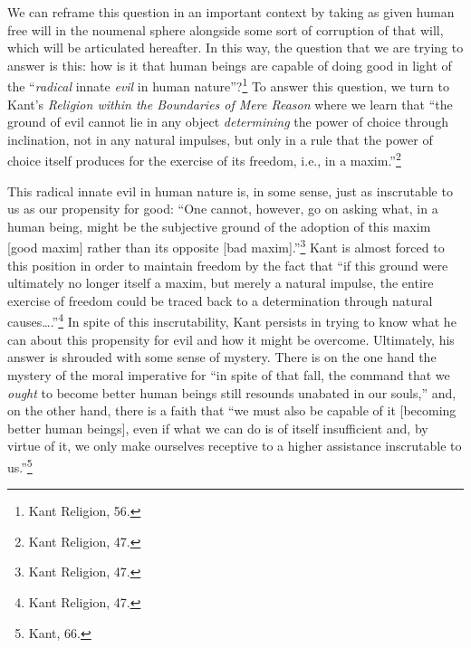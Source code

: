 \documentclass[12pt]{article}
\begin{document}
	We can reframe this question in an important context by taking as given human free will in the noumenal sphere alongside some sort of corruption of that will, which will be articulated hereafter. In this way, the question that we are trying to answer is this: how is it that human beings are capable of doing good in light of the ``\emph{radical} innate \emph{evil} in human nature''?\footnote{Kant Religion, 56.} To answer this question, we turn to Kant's \emph{Religion within the Boundaries of Mere Reason} where we learn that ``the ground of evil cannot lie in any object \emph{determining} the power of choice through inclination, not in any natural impulses, but only in a rule that the power of choice itself produces for the exercise of its freedom, i.e., in a maxim.''\footnote{Kant Religion, 47.}

	This radical innate evil in human nature is, in some sense, just as inscrutable to us as our propensity for good: ``One cannot, however, go on asking what, in a human being, might be the subjective ground of the adoption of this maxim [good maxim] rather than its opposite [bad maxim].''\footnote{Kant Religion, 47.} Kant is almost forced to this position in order to maintain freedom by the fact that ``if this ground were ultimately no longer itself a maxim, but merely a natural impulse, the entire exercise of freedom could be traced back to a determination through natural causes\ldots.''\footnote{Kant Religion, 47.} In spite of this inscrutability, Kant persists in trying to know what he can about this propensity for evil and how it might be overcome. Ultimately, his answer is shrouded with some sense of mystery. There is on the one hand the mystery of the moral imperative for ``in spite of that fall, the command that we \emph{ought} to become better human beings still resounds unabated in our souls,'' and, on the other hand, there is a faith that ``we must also be capable of it [becoming better human beings], even if what we can do is of itself insufficient and, by virtue of it, we only make ourselves receptive to a higher assistance inscrutable to us.''\footnote{Kant, 66.} 
	
\end{document}
